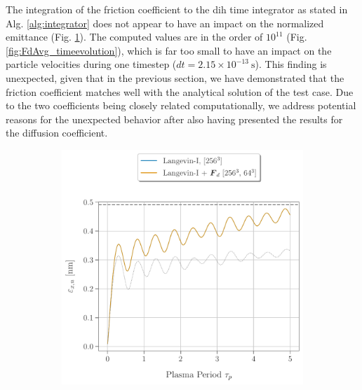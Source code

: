 The integration of the friction coefficient to the \gls{dih} time integrator as stated in Alg.
\ref{alg:integrator} does not appear to have an impact on the normalized emittance (Fig.
\ref{fig:Fd_DIH}).
The computed values are in the order of $10^{11}$ (Fig. \ref{fig:FdAvg_timeevolution}), which
is far too small to have an impact on the particle velocities during one timestep ($dt = 2.15 \times 10^{-13}\ \text{s}$).
This finding is unexpected, given that in the previous section, we have demonstrated that the
friction coefficient matches well with the analytical solution of the test case.
Due to the two coefficients being closely related computationally, we address potential reasons for
the unexpected behavior after also having presented the results for the diffusion coefficient.

\begin{figure}[h]
  \begin{subfigure}[b]{0.49\textwidth}
    \includegraphics[width=1.0\textwidth, keepaspectratio, valign=b]{figures/results/Langevin_Fd.pdf}
    \caption{}
    \label{fig:Fd_DIH}
  \end{subfigure}
  \hfill
  \begin{subfigure}[b]{0.49\textwidth}

\end{subfigure}
\end{figure}
